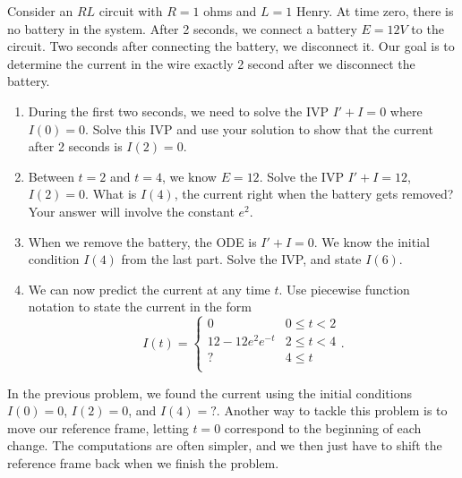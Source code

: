 \begin{problem}
 Consider an $RL$ circuit with $R=1$ ohms and $L=1$ Henry.  At time zero, there is no battery in the system.  After 2 seconds,  we connect a battery $E=12 V$ to the circuit.  Two seconds after connecting the battery, we disconnect it.  Our goal is to determine the current in the wire exactly 2 second after we disconnect the battery.
\begin{enumerate}
 \item During the first  two seconds, we need to solve the IVP $I'+I=0$ where $I(0)=0$.  Solve this IVP and use your solution to show that the current after 2 seconds is $I(2)=0$.
 \item Between $t=2$ and $t=4$, we know $E=12$.  Solve the IVP $I'+I=12$, $I(2)=0$. What is $I(4)$, the current right when the battery gets removed? Your answer will involve the constant $e^{2}$.
 \item When we remove the battery, the ODE is $I'+I=0$. We know the initial condition $I(4)$ from the last part.  Solve the IVP, and state $I(6)$. 
 \item We can now predict the current at any time $t$. Use piecewise function notation to state the current in the form
$$I(t) = 
\begin{cases}
 0 & 0\leq t< 2\\
 12-12e^{2}e^{-t} & 2\leq t< 4\\
 ? & 4\leq t\\
\end{cases}
.$$ 
\end{enumerate}
\end{problem}

In the previous problem, we found the current using the initial conditions $I(0)=0$, $I(2)=0$, and $I(4)=?$. Another way to tackle this problem is to move our reference frame, letting $t=0$ correspond to the beginning of each change. The computations are often simpler, and we then just have to shift the reference frame back when we finish the problem. 

